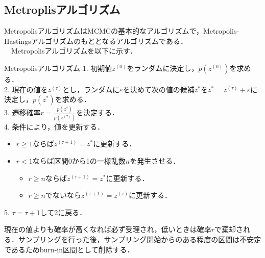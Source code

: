 \documentclass[11pt, a4paper]{jarticle}
\begin{document}
\subsection{Metroplisアルゴリズム}
MetropolisアルゴリズムはMCMCの基本的なアルゴリズムで，Metropolis-Hastingsアルゴリズムのもととなるアルゴリズムである．\\
　Metropolisアルゴリズムを以下に示す\cite{wakui}．
\begin{itembox}[c]{Metropolisアルゴリズム}
  	1.  初期値$z^{(0)}$をランダムに決定し，$p(z^{(0)})$を求める． \\ 
	2.  現在の値を$z^{(\tau)}$とし，ランダムに$\varepsilon$を決めて次の値の候補$z^{*}$を$z^{*} = z^{(\tau)} + \varepsilon$に決定し，$p(z^{*})$を求める．\\
	3.  遷移確率$r	= \frac {p(z^{*})}{p(z^{(\tau)})}$を決定する．\\
	4. 条件により，値を更新する．
	\begin{itemize}
		\item  $r \ge 1$ならば$z^{(\tau+1)} = z^{*}$に更新する． 
		\item  $r < 1$ならば区間0から1の一様乱数$n$を発生させる．
		\begin{itemize}
			\item	$r \ge n$ならば$z^{(\tau+1)} = z^{*}$に更新する． 
			\item $r \ge n$でないなら$z^{(\tau+1)} = z^{(\tau)}$に更新する．
		\end{itemize}
	\end{itemize}
	5.  $\tau = \tau + 1$して2に戻る．
\end{itembox}
現在の値よりも確率が高くなれば必ず受理され，低いときは確率$r$で棄却される．サンプリングを行った後，サンプリング開始からのある程度の区間は不安定であるためburn-in区間として削除する．

\end{document}
